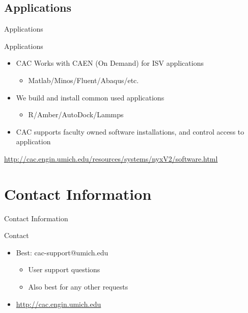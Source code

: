 \documentclass[handout]{beamer}
\begin{document}
    \subsection{Applications}
     \begin{frame}{Applications}
      \begin{block}{Applications}
       \begin{itemize}
        \item CAC Works with CAEN (On Demand) for ISV applications
        \begin{itemize}
          \item Matlab/Minos/Fluent/Abaqus/etc.
        \end{itemize}
        \item We build and install common used applications
        \begin{itemize}
          \item R/Amber/AutoDock/Lammps
        \end{itemize}
        \item CAC supports faculty owned software installations, and control access to application
       \end{itemize}
      \end{block}
      \url{http://cac.engin.umich.edu/resources/systems/nyxV2/software.html}
     \end{frame}
  \section{Contact Information}
   \begin{frame}{Contact Information}
    \begin{block}{Contact}
     \begin{itemize}
      \item Best: cac-support@umich.edu
      \begin{itemize}
       \item User support questions
       \item Also best for any other requests
      \end{itemize}
      \item \url{http://cac.engin.umich.edu}
     \end{itemize}
    \end{block}
   \end{frame}
\end{document}
